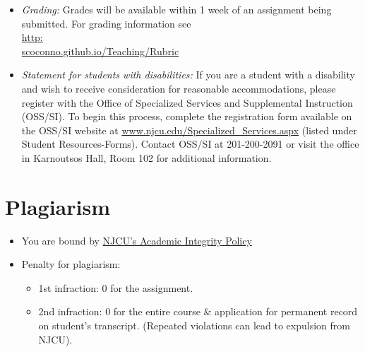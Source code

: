 \documentclass[11pt,article,oneside]{memoir}
\begin{document}
\begin{itemize}
\item \textit{Grading:} Grades will be available within 1 week of an assignment being submitted. For grading information see\\ \href{http://scoconno.github.io/Teaching/Rubric.}{http:\\scoconno.github.io/Teaching/Rubric}


\item \textit{Statement for students with disabilities:} If you are a student
with a disability and wish to receive consideration for reasonable
accommodations, please register with the Office of Specialized Services
and Supplemental Instruction (OSS/SI). To begin this process, complete
the registration form available on the OSS/SI website at
\href{http://www.njcu.edu/Specialized_Services.aspx}{www.njcu.edu/Specialized\_Services.aspx}
(listed under Student Resources-Forms). Contact OSS/SI at 201-200-2091
or visit the office in Karnoutsos Hall, Room 102 for additional
information.
\end{itemize}

\section{Plagiarism}

\begin{itemize} 
\item You are bound by \href{http://www.njcu.edu/uploadedFiles/About_NJCU/Governance_and_Organization/University_Senate/Policies/Academic\%20INTEGRITY\%20POLICY\%20FINAL\%202-04.pdf}{NJCU's Academic Integrity Policy}
\item Penalty for plagiarism:
\begin{itemize}
\item 1st infraction: 0 for the assignment. 
\item 2nd infraction: 0 for the entire course \& application for permanent record on student's transcript. (Repeated violations can lead to expulsion from NJCU). 
\end{itemize}
\end{itemize}
\end{document}
